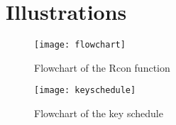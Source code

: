 \chapter{Illustrations} \label{app:fig}

\begin{figure}
  \begin{center}
    \texttt{[image: flowchart]}
  \end{center}
  \caption{Flowchart of the Rcon function}
  \label{img:rcon}
\end{figure}

\begin{figure}
  \texttt{[image: keyschedule]}
  \caption{Flowchart of the key schedule}
  \label{img:keysch}
\end{figure}


